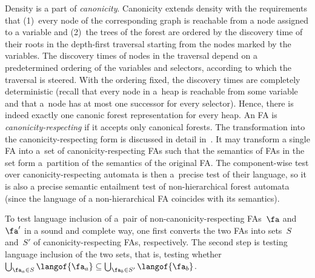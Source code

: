 Density is a part of \emph{canonicity}.
%
Canonicity extends density with the requirements that
(1)~every node of the corresponding graph is reachable from a node assigned to a variable and
(2)~the trees of the forest are ordered by the discovery time of their roots in the depth-first traversal starting from the nodes marked by the variables. 
%
The discovery times of nodes in the traversal depend on a predetermined ordering
of the variables and selectors, according to which the traversal is steered.
With the ordering fixed, the discovery times are completely deterministic
(recall that every node in a~heap is reachable from some variable and that a~node
has at most one successor for every selector).
%
Hence, there is indeed exactly one canonic forest representation for every heap.
%
An FA is \emph{canonicity-respecting} if it accepts only canonical forests.
The transformation into the canonicity-respecting form is discussed in detail in~\cite{forester11,jiri:diza}. 
%
It may transform a single FA into a~set of canonicity-respecting FAs such that
the semantics of FAs in the set form a~partition of the semantics of the
original FA.
%
%
The component-wise test over canonicity-respecting automata is then a~precise
test of their language, so it is also a precise semantic entailment test of
non-hierarchical forest automata (since the language of a non-hierarchical FA
coincides with its semantics).


To test language inclusion of a~pair of non-canonicity-respecting FAs~$\fa$ and~$\fa'$ in a sound and complete way, 
one first converts the two FAs into sets~$S$ and~$S'$ of canonicity-respecting FAs, respectively.
The second step is testing language inclusion of the two sets, that is, testing whether $\bigcup_{\fa_a\in S}\langof{\fa_a} \subseteq \bigcup_{\fa_{b}\in S'}\langof{\fa_{b}}$.
%

